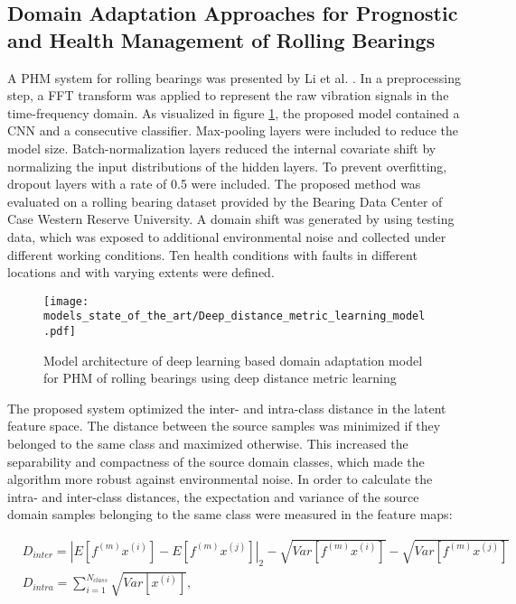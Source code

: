 \subsection{Domain Adaptation Approaches for Prognostic and Health Management of Rolling Bearings}

A PHM system for rolling bearings was presented by Li et al. \cite{Li2018}. In a preprocessing step, a FFT transform was applied to represent the raw vibration signals in the time-frequency domain. As visualized in figure \ref{fig:Deep_distance_metric_learning_model}, the proposed model contained a CNN and a consecutive classifier. Max-pooling layers were included to reduce the model size. Batch-normalization layers reduced the internal covariate shift by normalizing the input distributions of the hidden layers. To prevent overfitting, dropout layers with a rate of 0.5 were included. The proposed method was evaluated on a rolling bearing dataset provided by the Bearing Data Center of Case Western Reserve University. A domain shift was generated by using testing data, which was exposed to additional environmental noise and collected under different working conditions. Ten health conditions with faults in different locations and with varying extents were defined. 

\begin{figure}[H]
  \centering
  \texttt{[image: models\_state\_of\_the\_art/Deep\_distance\_metric\_learning\_model.pdf]}
  \caption{Model architecture of deep learning based domain adaptation model for PHM of rolling bearings using deep distance metric learning \cite{Li2018}}
  \label{fig:Deep_distance_metric_learning_model}
\end{figure}


The proposed system optimized the inter- and intra-class distance in the latent feature space. The distance between the source samples was minimized if they belonged to the same class and maximized otherwise. This increased the separability and compactness of the source domain classes, which made the algorithm more robust against environmental noise. In order to calculate the intra- and inter-class distances, the expectation and variance of the source domain samples belonging to the same class were measured in the feature maps:

\begin{equation}
    \begin{aligned}
       &D_{inter} = |E[f^{(m)}x^{(i)}]-E[f^{(m)}x^{(j)}]|_{2}-\sqrt{Var[f^{(m)}x^{(i)}]}-\sqrt{Var[f^{(m)}x^{(j)}]}\\
       &D_{intra} = 
        \sum_{i=1}^{N_{class}} \sqrt{Var[x^{(i)}]},
    \end{aligned}
\end{equation}

